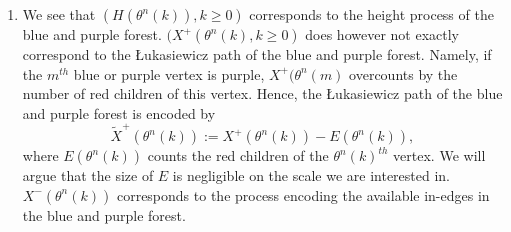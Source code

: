 \begin{enumerate}
\item We see that $(H(\theta^{n}(k)),k\geq 0)$ corresponds to the height process of the blue and purple forest. $(X^+(\theta^{n}(k),k\geq 0)$ does however not exactly correspond to the \L ukasiewicz path of the blue and purple forest. Namely, if the $m^{th}$ blue or purple vertex is purple, $X^+(\theta^{n}(m)$ overcounts by the number of red children of this vertex. Hence, the \L ukasiewicz path of the blue and purple forest is encoded by \begin{equation}\label{eq.definitiontildeX}\tilde{X}^+(\theta^{n}(k)):=X^+(\theta^{n}(k))-E(\theta^{n}(k)),\end{equation}
where 
$E(\theta^{n}(k))$ counts the red children of the $\theta^n(k)^{th}$ vertex. We will argue that the size of $E$ is negligible on the scale we are interested in. $X^-(\theta^{n}(k))$ corresponds to the process encoding the available in-edges in the blue and purple forest.
\end{enumerate} 

